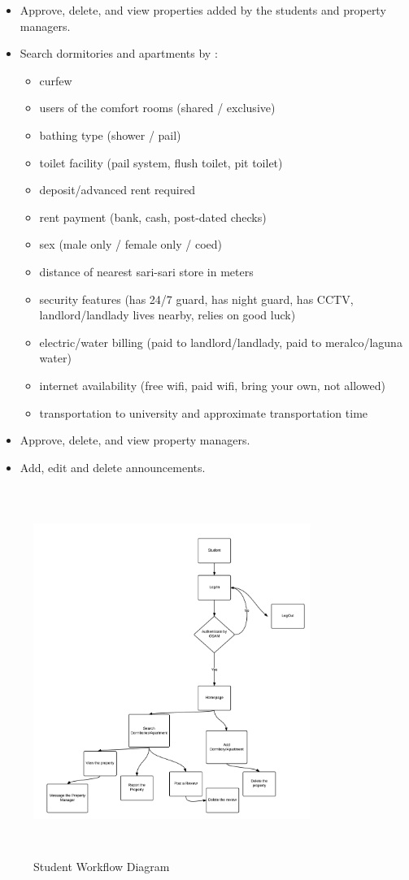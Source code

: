 \documentclass[journal]{./IEEE/IEEEtran}
\begin{document}
\begin{enumerate}
			\begin{itemize}
				\item Approve, delete, and view properties added by the students and property managers.
				\item Search dormitories and apartments by :
					\begin{itemize}
						\item curfew
						\item users of the comfort rooms (shared / exclusive)
						\item bathing type (shower / pail)
						\item toilet facility (pail system, flush toilet, pit toilet) 
						\item deposit/advanced rent required
						\item rent payment (bank, cash, post-dated checks)
						\item sex (male only / female only / coed)
						\item distance of nearest sari-sari store in meters
						\item security features (has 24/7 guard, has night guard, has CCTV, landlord/landlady lives nearby, relies on good luck)
						\item electric/water billing (paid to landlord/landlady, paid to meralco/laguna water)
						\item internet availability (free wifi, paid wifi, bring your own, not allowed)
						\item transportation to university and approximate transportation time

					\end{itemize}
				\item Approve, delete, and view property managers.
				\item Add, edit and delete announcements.
			\end{itemize}
			\begin{figure} 
			\centering
			\includegraphics[width=9cm,height=12cm]{images/student.png}
			\caption{Student Workflow Diagram}
		

\end{figure}
\end{enumerate}
\end{document}
